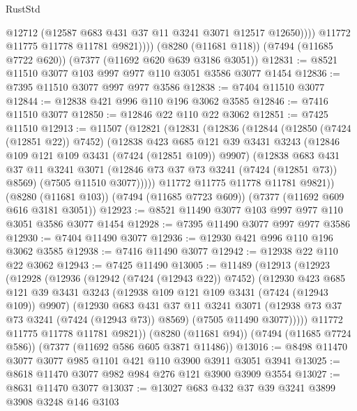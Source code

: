 \begin{lexlean}{RustStd}
\begin{coremodule}
                  @12712
                  (@12587 @683 @431 @37 @11 @3241 @3071 @12517 @12650))))
            @11772
            @11775
            @11778
            @11781
            @9821))))
    (@8280 (@11681 @118))
    (@7494 (@11685 @7722 @620))
    (@7377 (@11692 @620 @639 @3186 @3051))
@12831 := @8521 @11510 @3077 @103 @997 @977 @110 @3051 @3586 @3077 @1454
@12836 := @7395 @11510 @3077 @997 @977 @3586
@12838 := @7404 @11510 @3077
@12844 := @12838 @421 @996 @110 @196 @3062 @3585
@12846 := @7416 @11510 @3077
@12850 := @12846 @22 @110 @22 @3062
@12851 := @7425 @11510
@12913 := @11507
    (@12821
      (@12831
        (@12836
          (@12844
            (@12850 (@7424 (@12851 @22)) @7452)
            (@12838
              @423
              @685
              @121
              @39
              @3431
              @3243
              (@12846 @109 @121 @109 @3431 (@7424 (@12851 @109)) @9907)
              (@12838
                @683
                @431
                @37
                @11
                @3241
                @3071
                (@12846 @73 @37 @73 @3241 (@7424 (@12851 @73)) @8569)
                (@7505 @11510 @3077)))))
        @11772
        @11775
        @11778
        @11781
        @9821))
    (@8280 (@11681 @103))
    (@7494 (@11685 @7723 @609))
    (@7377 (@11692 @609 @616 @3181 @3051))
@12923 := @8521 @11490 @3077 @103 @997 @977 @110 @3051 @3586 @3077 @1454
@12928 := @7395 @11490 @3077 @997 @977 @3586
@12930 := @7404 @11490 @3077
@12936 := @12930 @421 @996 @110 @196 @3062 @3585
@12938 := @7416 @11490 @3077
@12942 := @12938 @22 @110 @22 @3062
@12943 := @7425 @11490
@13005 := @11489
    (@12913
      (@12923
        (@12928
          (@12936
            (@12942 (@7424 (@12943 @22)) @7452)
            (@12930
              @423
              @685
              @121
              @39
              @3431
              @3243
              (@12938 @109 @121 @109 @3431 (@7424 (@12943 @109)) @9907)
              (@12930
                @683
                @431
                @37
                @11
                @3241
                @3071
                (@12938 @73 @37 @73 @3241 (@7424 (@12943 @73)) @8569)
                (@7505 @11490 @3077)))))
        @11772
        @11775
        @11778
        @11781
        @9821))
    (@8280 (@11681 @94))
    (@7494 (@11685 @7724 @586))
    (@7377 (@11692 @586 @605 @3871 @11486))
@13016 := @8498 @11470 @3077 @3077 @985 @1101 @421 @110 @3900 @3911 @3051 @3941
@13025 := @8618 @11470 @3077 @982 @984 @276 @121 @3900 @3909 @3554
@13027 := @8631 @11470 @3077
@13037 := @13027 @683 @432 @37 @39 @3241 @3899 @3908 @3248 @146 @3103

\end{coremodule}
\end{lexlean}
